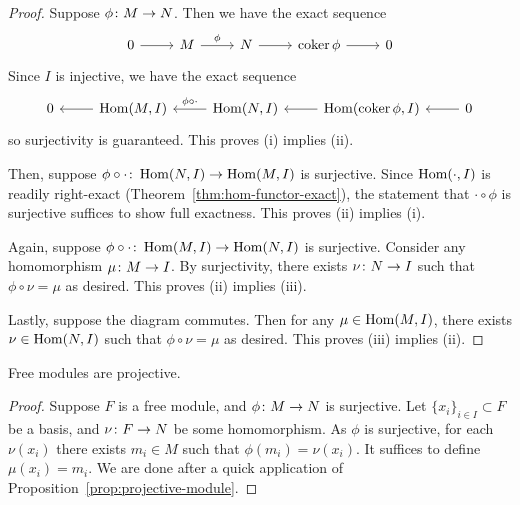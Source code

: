 \begin{proof}
    Suppose \(\phi\colon M\to N\).
    Then we have the exact sequence
    \begin{equation*}
        \begin{tikzcd}
            0 \arrow{r} & M \arrow{r}{\phi} & N \arrow{r} & \coker\phi \arrow{r} & 0
        \end{tikzcd}
    \end{equation*}
    Since \(I\) is injective, we have the exact sequence
    \begin{equation*}
        \begin{tikzcd}
            0 & \Hom(M,I) \arrow{l} & \Hom(N,I) \arrow{l}[swap]{\phi\circ\cdot} &
            \Hom(\coker\phi,I) \arrow{l} & 0 \arrow{l}
        \end{tikzcd}
    \end{equation*}
    so surjectivity is guaranteed.
    This proves (i) implies (ii).

    Then, suppose \(\phi\circ\cdot\colon\operatorname{Hom}(N,I)\to\operatorname{Hom}(M,I)\) is surjective.
    Since \(\operatorname{Hom}(\cdot,I)\) is readily right-exact (Theorem~\ref{thm:hom-functor-exact}),
    the statement that \(\cdot\circ\phi\) is surjective suffices to show full exactness.
    This proves (ii) implies (i).

    Again, suppose \(\phi\circ\cdot\colon\operatorname{Hom}(M,I)\to\operatorname{Hom}(N,I)\) is surjective.
    Consider any homomorphism \(\mu\colon M\to I\).
    By surjectivity, there exists \(\nu\colon N\to I\)
    such that \(\phi\circ\nu = \mu\) as desired.
    This proves (ii) implies (iii).

    Lastly, suppose the diagram commutes.
    Then for any \(\mu \in \operatorname{Hom}(M,I)\),
    there exists \(\nu \in \operatorname{Hom}(N,I)\) such that \(\phi\circ\nu = \mu\) as desired.
    This proves (iii) implies (ii).
\end{proof}

\begin{proposition}
    Free modules are projective.
\end{proposition}
\begin{proof}
    Suppose \(F\) is a free module,
    and \(\phi\colon M\to N\) is surjective.
    Let \({\{x_i\}}_{i \in I} \subset F\) be a basis,
    and \(\nu\colon F\to N\) be some homomorphism.
    As \(\phi\) is surjective, for each \(\nu(x_i)\)
    there exists \(m_i \in M\) such that \(\phi(m_i) = \nu(x_i)\).
    It suffices to define \(\mu(x_i) = m_i\).
    We are done after a quick application of Proposition~\ref{prop:projective-module}.
\end{proof}


